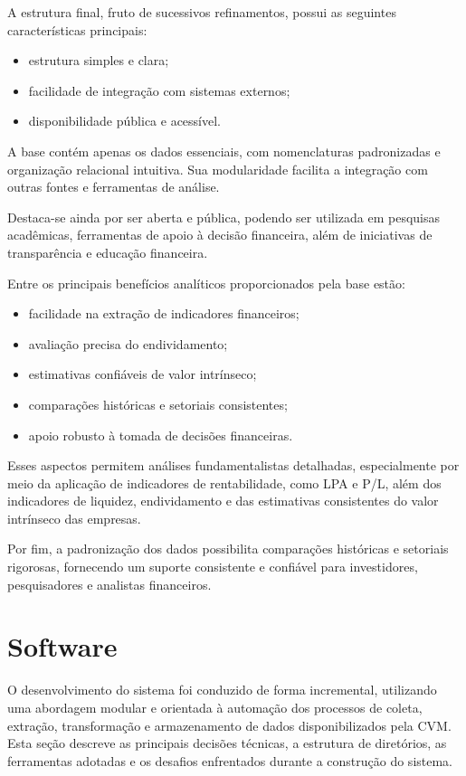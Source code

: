 A estrutura final, fruto de sucessivos refinamentos, possui as seguintes características principais:

\begin{itemize}
	\item estrutura simples e clara;
	\item facilidade de integração com sistemas externos;
	\item disponibilidade pública e acessível.
\end{itemize}

A base contém apenas os dados essenciais, com nomenclaturas padronizadas e organização relacional intuitiva. Sua modularidade facilita a integração com outras fontes e ferramentas de análise.

Destaca-se ainda por ser aberta e pública, podendo ser utilizada em pesquisas acadêmicas, ferramentas de apoio à decisão financeira, além de iniciativas de transparência e educação financeira.

Entre os principais benefícios analíticos proporcionados pela base estão:

\begin{itemize}
	\item facilidade na extração de indicadores financeiros;
	\item avaliação precisa do endividamento;
	\item estimativas confiáveis de valor intrínseco;
	\item comparações históricas e setoriais consistentes;
	\item apoio robusto à tomada de decisões financeiras.
\end{itemize}

Esses aspectos permitem análises fundamentalistas detalhadas, especialmente por meio da aplicação de indicadores de rentabilidade, como LPA e P/L, além dos indicadores de liquidez, endividamento e das estimativas consistentes do valor intrínseco das empresas.

Por fim, a padronização dos dados possibilita comparações históricas e setoriais rigorosas, fornecendo um suporte consistente e confiável para investidores, pesquisadores e analistas financeiros.

\section{Software} \label{sec:software}

O desenvolvimento do sistema foi conduzido de forma incremental, utilizando uma abordagem modular e orientada à automação dos processos de coleta, extração, transformação e armazenamento de dados disponibilizados pela CVM. Esta seção descreve as principais decisões técnicas, a estrutura de diretórios, as ferramentas adotadas e os desafios enfrentados durante a construção do sistema.

